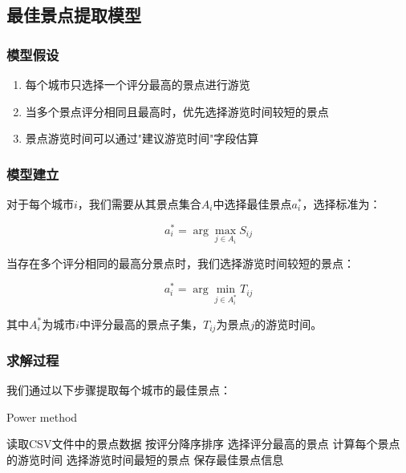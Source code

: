 \documentclass[withoutpreface,bwprint]{cumcmthesis} %
\begin{document}

\subsection{最佳景点提取模型}

\subsubsection{模型假设}
\begin{enumerate}
    \item 每个城市只选择一个评分最高的景点进行游览
    \item 当多个景点评分相同且最高时，优先选择游览时间较短的景点
    \item 景点游览时间可以通过"建议游览时间"字段估算
\end{enumerate}

\subsubsection{模型建立}
对于每个城市$i$，我们需要从其景点集合$A_i$中选择最佳景点$a_i^*$，选择标准为：

\begin{equation}
a_i^* = \arg\max_{j \in A_i} S_{ij}
\end{equation}

当存在多个评分相同的最高分景点时，我们选择游览时间较短的景点：

\begin{equation}
a_i^* = \arg\min_{j \in A_i^*} T_{ij}
\end{equation}

其中$A_i^*$为城市$i$中评分最高的景点子集，$T_{ij}$为景点$j$的游览时间。

\subsubsection{求解过程}
我们通过以下步骤提取每个城市的最佳景点：

\begin{algorithm}[!ht]
    \renewcommand{\algorithmicrequire}{\textbf{Input:}}
	\renewcommand{\algorithmicensure}{\textbf{Output:}}
	\caption{Power method}
    \label{power}
    \begin{algorithmic}[1] %
    \STATE 读取CSV文件中的景点数据
    \STATE 按评分降序排序
    \STATE 选择评分最高的景点
        \STATE 计算每个景点的游览时间
        \STATE 选择游览时间最短的景点
    \ENDIF
    \STATE 保存最佳景点信息
\ENDFOR
\end{algorithmic}
\end{algorithm}
\end{document}
